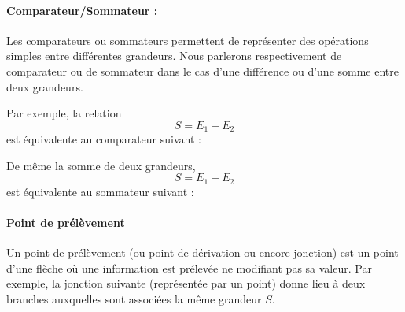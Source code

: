 \paragraph{Comparateur/Sommateur :}

Les comparateurs ou sommateurs permettent de représenter des opérations 
simples entre différentes grandeurs.
Nous parlerons respectivement de comparateur ou de sommateur dans le cas 
d'une différence ou d'une somme entre deux grandeurs. 


Par exemple, la relation 
$$
S = E_1-E_2 
$$
est équivalente au comparateur suivant :
\begin{center}
\end{center}

De même la somme de deux grandeurs,
$$                                                                                                                            
S = E_1+E_2                                                                                                          
$$
est équivalente au sommateur suivant :
\begin{center}
\end{center}

\paragraph{Point de prélèvement}

Un point de prélèvement (ou point de dérivation ou encore jonction) 
est un point d'une flèche où une information est prélevée ne modifiant pas sa valeur.
Par exemple, la jonction suivante (représentée par un point) donne lieu à deux branches auxquelles sont
associées la même grandeur $S$.


